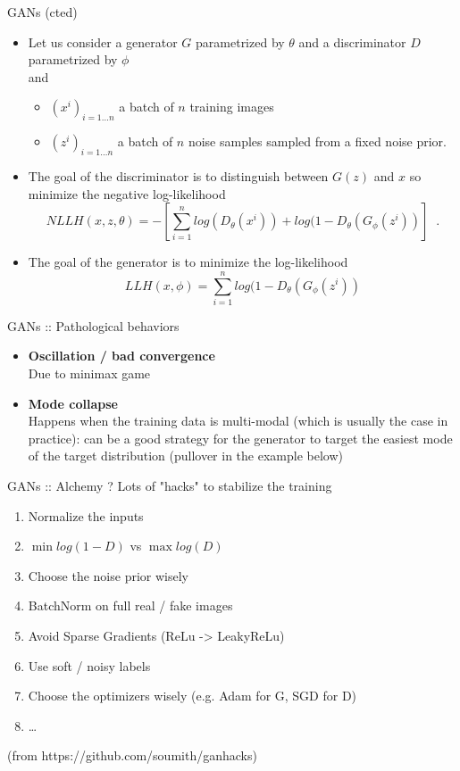 \documentclass{beamer}
\begin{document}
\begin{frame}{GANs (cted)}
    \begin{itemize}
        \item Let us consider a generator $G$ parametrized by $\theta$ and a discriminator $D$ parametrized by $\phi$\\
        and
            \begin{itemize}
                \item $(x^i)_{i=1\dots n}$ a batch of $n$ training images
                \item $(z^i)_{i=1\dots n}$ a batch of $n$ noise samples sampled from a fixed noise prior.
            \end{itemize}
        \item The goal of the discriminator is to distinguish between $G(z)$ and $x$ so \textcolor{cOrange}{minimize} the negative log-likelihood
        \textcolor{cOrange}{\[ NLLH(x,z, \theta) = -\left[ \sum_{i=1}^n log(D_\theta(x^i)) + log(1-D_\theta(G_\phi(z^i)) \right] \;\;. \]}
        \item The goal of the generator is to \textcolor{cBlue}{minimize} the log-likelihood
        \textcolor{cBlue}{\[ LLH(x,\phi) = \sum_{i=1}^n log(1-D_\theta(G_\phi(z^i)) \]}
    \end{itemize}
\end{frame}

\begin{frame}{GANs :: Pathological behaviors}
\begin{itemize}
    \item \textbf{Oscillation / bad convergence}~\\
    Due to minimax game
    \item \textbf{Mode collapse}~\\
    Happens when the training data is multi-modal (which is usually the case in practice): can be a good strategy for the generator to target the easiest mode of the target distribution (pullover in the example below)
\end{itemize}
\end{frame}

\begin{frame}{GANs :: Alchemy ?}
Lots of "hacks" to stabilize the training
    \begin{enumerate}
        \item Normalize the inputs
        \item $\mathop{min} log(1-D)$ vs $\mathop{max} log(D)$
        \item Choose the noise prior wisely
        \item BatchNorm on full real / fake images
        \item Avoid Sparse Gradients (ReLu -> LeakyReLu)
        \item Use soft / noisy labels
        \item Choose the optimizers wisely (e.g. Adam for G, SGD for D)
        \item \dots
    \end{enumerate}
    (from https://github.com/soumith/ganhacks)
\end{frame}
\end{document}
